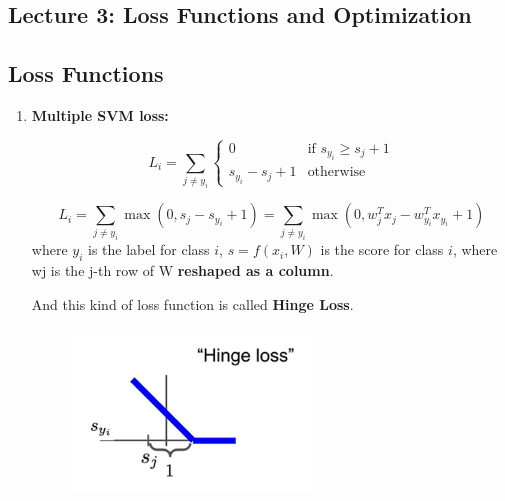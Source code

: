 \documentclass{article}
\numberwithin{equation}{section}
\begin{document}
\begin{CJK}{UTF8}{gbsn}
\newpage
\section*{Lecture 3: Loss Functions and Optimization}
\setcounter{section}{3}
\setcounter{subsection}{0}
\setcounter{equation}{0}

\subsection{Loss Functions}
\begin{enumerate}
    \item \textbf{Multiple SVM loss:}\par
    \begin{equation*}
        L_i = \sum_{j \neq y_i} \begin{cases}
            0 & \text{if } s_{y_i} \geq s_j + 1 \\
            s_{y_i} - s_j + 1 & \text{otherwise } 
        \end{cases}
    \end{equation*}
    
    \begin{equation}\tag{SVM-Loss}
        L_i = \sum_{j \neq y_i} \max(0, s_j - s_{y_i} + 1) = \sum_{j \neq y_i} \max(0, w^T_j x_j - w^T_{y_i} x_{y_i} + 1)
    \end{equation}
    where \(y_i\) is the label for class \(i\), \(s = f(x_i, W)\) is the score for class \(i\), where wj
    is the j-th row of W \textbf{reshaped as a column}.\par

    And this kind of loss function is called \textbf{Hinge Loss}.\par
    \begin{figure}[h]
        \centering
        \includegraphics[width=0.6\textwidth]{images/Lecture3/Hinge_loss.png}
    \end{figure}


\end{enumerate}
\end{CJK}
\end{document}
